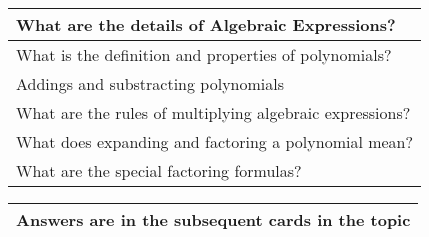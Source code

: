 \begin{small}
    \begin{tabularx}{1\textwidth}{
            p{}
        }
        \toprule
        \textbf{What are the details of Algebraic Expressions?}
        \\
        \midrule

        What is the definition and properties of polynomials?
        \\
        \midrule

        Addings and substracting polynomials
        \\
        \midrule

        What are the rules of multiplying algebraic expressions?
        \\
        \midrule

        What does expanding and factoring a polynomial mean?
        \\
        \midrule

        What are the special factoring formulas?
        \\
        \bottomrule

    \end{tabularx}
\end{small}
\begin{small}
    \begin{tabularx}{1\textwidth}{
            p{}
        }
        \toprule
        Answers are in the subsequent cards in the topic
        \\
        \bottomrule

    \end{tabularx}
\end{small}
